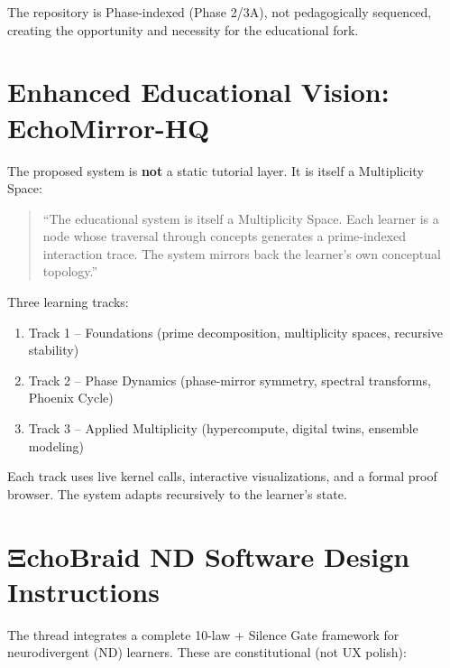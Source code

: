 \documentclass[11pt,letterpaper]{article}
\begin{document}
The repository is Phase-indexed (Phase 2/3A), not pedagogically sequenced, creating the opportunity and necessity for the educational fork.

\section{Enhanced Educational Vision: EchoMirror-HQ}
The proposed system is \textbf{not} a static tutorial layer. It is itself a Multiplicity Space:
\begin{quote}
``The educational system is itself a Multiplicity Space. Each learner is a node whose traversal through concepts generates a prime-indexed interaction trace. The system mirrors back the learner's own conceptual topology.''
\end{quote}

Three learning tracks:
\begin{enumerate}
\item Track 1 -- Foundations (prime decomposition, multiplicity spaces, recursive stability)
\item Track 2 -- Phase Dynamics (phase-mirror symmetry, spectral transforms, Phoenix Cycle)
\item Track 3 -- Applied Multiplicity (hypercompute, digital twins, ensemble modeling)
\end{enumerate}

Each track uses live kernel calls, interactive visualizations, and a formal proof browser. The system adapts recursively to the learner's state.

\section{ΞchoBraid ND Software Design Instructions}
The thread integrates a complete 10-law + Silence Gate framework for neurodivergent (ND) learners. These are constitutional (not UX polish):
\end{document}
